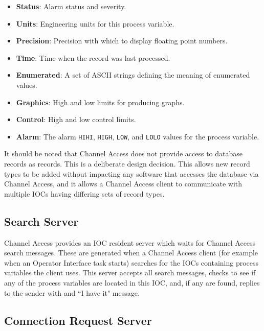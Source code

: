 \begin{itemize}\item \textbf{Status}:  Alarm status and severity.

\item \textbf{Units}:  Engineering units for this process variable.

\item \textbf{Precision}:  Precision with which to display floating point numbers.

\item \textbf{Time}:  Time when the record was last processed.

\item \textbf{Enumerated}:  A set of ASCII strings defining the meaning of enumerated values.

\item \textbf{Graphics}:  High and low limits for producing graphs.

\item \textbf{Control}:  High and low control limits.

\item \textbf{Alarm}:  The alarm \verb|HIHI|, \verb|HIGH|, \verb|LOW|, and \verb|LOLO| values for the process variable.

\end{itemize}It should be noted that Channel Access does not provide access to database records as records. This is a deliberate design 
decision. This allows new record types to be added without impacting any software that accesses the database via Channel 
Access, and it allows a Channel Access client to communicate with multiple IOCs having differing sets of record types.

\subsection{Search Server}

Channel Access provides an IOC resident server which waits for Channel Access search messages. These are generated 
when a Channel Access client (for example when an Operator Interface task starts) searches for the IOCs containing 
process variables the client uses. This server accepts all search messages, checks to see if any of the process variables are 
located in this IOC, and, if any are found, replies to the sender with and ``I have it" message.

\subsection{Connection Request Server}

